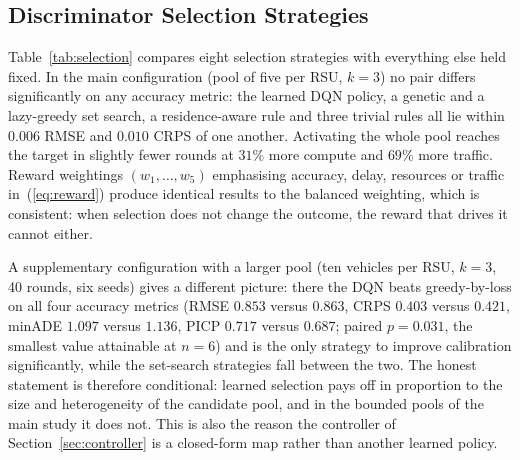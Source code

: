\documentclass[journal]{IEEEtran}
\begin{document}
\subsection{Discriminator Selection Strategies}
\label{sec:selection}
Table~\ref{tab:selection} compares eight selection strategies with everything
else held fixed. In the main configuration (pool of five per RSU, $k=3$) no
pair differs significantly on any accuracy metric: the learned DQN policy, a
genetic and a lazy-greedy set search, a residence-aware rule and three trivial
rules all lie within $0.006$ RMSE and $0.010$ CRPS of one another. Activating
the whole pool reaches the target in slightly fewer rounds at $31\%$ more
compute and $69\%$ more traffic. Reward weightings $(w_1,\ldots,w_5)$ emphasising
accuracy, delay, resources or traffic in~(\ref{eq:reward}) produce identical
results to the balanced weighting, which is consistent: when selection does not
change the outcome, the reward that drives it cannot either.

A supplementary configuration with a larger pool (ten vehicles per RSU,
$k=3$, 40 rounds, six seeds) gives a different picture: there the DQN beats
greedy-by-loss on all four accuracy metrics (RMSE $0.853$ versus $0.863$,
CRPS $0.403$ versus $0.421$, minADE $1.097$ versus $1.136$, PICP $0.717$
versus $0.687$; paired $p=0.031$, the smallest value attainable at $n=6$) and
is the only strategy to improve calibration significantly, while the set-search
strategies fall between the two. The honest statement is therefore conditional:
learned selection pays off in proportion to the size and heterogeneity of the
candidate pool, and in the bounded pools of the main study it does not. This is
also the reason the controller of Section~\ref{sec:controller} is a closed-form
map rather than another learned policy.
\end{document}
